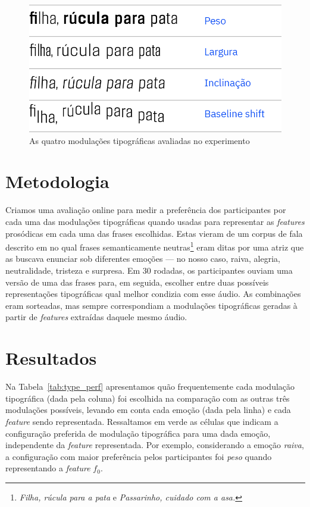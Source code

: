\documentclass[11pt]{article}
\begin{document}
\begin{figure}[H]
     {\centering
    \includegraphics[width=\linewidth]{fig/mod2.png}
     \caption{As quatro modulações tipográficas avaliadas no experimento}
     \label{fig:type_modulations}\par}
\end{figure}
  
  \section{Metodologia}
  \label{sec:metodologia}
 
 Criamos uma avaliação online para medir a preferência dos participantes por cada uma das modulações tipográficas quando usadas para representar as {\itshape features} prosódicas em cada uma das frases escolhidas. Estas vieram de um corpus de fala descrito em \cite{pdpcosta2015} no qual frases semanticamente neutras\footnote{{\itshape Filha, rúcula para a pata} e {\itshape Passarinho, cuidado com a asa.}} eram ditas por uma atriz que as buscava enunciar sob diferentes emoções --- no nosso caso, raiva, alegria, neutralidade, tristeza e surpresa. Em 30 rodadas, os participantes ouviam uma versão de uma das frases para, em seguida, escolher entre duas possíveis representações tipográficas qual melhor condizia com esse áudio. As combinações eram sorteadas, mas sempre correspondiam a modulações tipográficas geradas à partir de {\itshape features} extraídas daquele mesmo áudio.
  


\section{Resultados}
  \label{sec:resultados}
  
  Na Tabela~\ref{tab:type_perf} apresentamos quão frequentemente cada modulação tipográfica (dada pela coluna) foi escolhida na comparação com as outras três modulações possíveis, levando em conta cada emoção (dada pela linha) e cada {\itshape feature} sendo representada. Ressaltamos em verde as células que indicam a configuração preferida de modulação tipográfica para uma dada emoção, independente da {\itshape feature} representada. Por exemplo, considerando a emoção {\itshape raiva}, a configuração com maior preferência pelos participantes foi {\itshape peso} quando representando a {\itshape feature} $f_0$.
  
\end{document}
